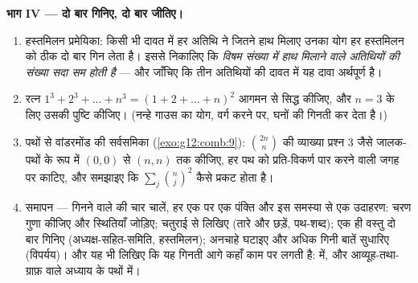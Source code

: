 \begin{problem}
\medskip
\noindent\textbf{भाग IV --- दो बार गिनिए, दो बार जीतिए।}
\begin{enumerate}[resume]
  \item हस्तमिलन प्रमेयिका: किसी भी दावत में हर अतिथि ने जितने हाथ मिलाए
        उनका योग हर हस्तमिलन को ठीक दो बार गिन लेता है। इससे निकालिए कि
        \emph{विषम संख्या में हाथ मिलाने वाले अतिथियों की संख्या सदा सम होती
        है} --- और जाँचिए कि तीन अतिथियों की दावत में यह दावा अर्थपूर्ण है।
  \item रत्न $1^3 + 2^3 + \dots + n^3 = (1 + 2 + \dots + n)^2$ आगमन से सिद्ध कीजिए, और $n = 3$ के लिए उसकी पुष्टि कीजिए।
        (नन्हे गाउस का योग, वर्ग करने पर, घनों की गिनती कर देता है।)
  \item पथों से वांडरमोंड की सर्वसमिका (\cref{exo:g12:comb:9}): $\binom{2n}{n}$ की व्याख्या प्रश्न 3
        जैसे जालक-पथों के रूप में $(0,0)$ से $(n,n)$ तक कीजिए, हर पथ को
        प्रति-विकर्ण पार करने वाली जगह पर काटिए, और समझाइए कि $\sum_j \binom nj^2$ कैसे
        प्रकट होता है।
  \item समापन --- गिनने वाले की चार चालें, हर एक पर एक पंक्ति और इस समस्या
        से एक उदाहरण: चरण गुणा कीजिए और स्थितियाँ जोड़िए; चतुराई से लिखिए
        (तारे और छड़ें, पथ-शब्द); एक ही वस्तु दो बार गिनिए
        (अध्यक्ष-सहित-समिति, हस्तमिलन); अनचाहे घटाइए और अधिक गिनी बातें
        सुधारिए (विपर्यय)। और यह भी लिखिए कि यह गिनती आगे कहाँ काम पर लगती
        है:  में, और आव्यूह-तथा-ग्राफ़ वाले अध्याय के पथों में।
\end{enumerate}
\end{problem}
